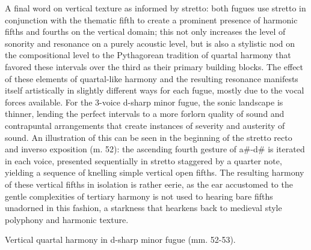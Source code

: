     A final word on vertical texture as informed by stretto: both fugues use
stretto in conjunction with the thematic fifth to create a prominent
presence of harmonic fifths and fourths on the vertical domain; this not
only increases the level of sonority and resonance on a purely acoustic
level, but is also a stylistic nod on the compositional level to the
Pythagorean tradition of quartal harmony that favored these intervals
over the third as their primary building blocks. The effect of these
elements of quartal-like harmony and the resulting resonance manifests
itself artistically in slightly different ways for each fugue, mostly
due to the vocal forces available. For the 3-voice d-sharp minor fugue,
the sonic landscape is thinner, lending the perfect intervals to a more
forlorn quality of sound and contrapuntal arrangements that create
instances of severity and austerity of sound. An illustration of this
can be seen in the beginning of the stretto recto and inverso exposition
(m. 52): the ascending fourth gesture of a\#-d\# is iterated in each
voice, presented sequentially in stretto staggered by a quarter note,
yielding a sequence of knelling simple vertical open fifths. The
resulting harmony of these vertical fifths in isolation is rather eerie,
as the ear accustomed to the gentle complexities of tertiary harmony is
not used to hearing bare fifths unadorned in this fashion, a starkness
that hearkens back to medieval style polyphony and harmonic texture.



\begin{Example}[H]
    \begin{center}
    \caption{ Vertical quartal harmony in d-sharp minor fugue (mm. 52-53). }
    \end{center}
\end{Example}
    
